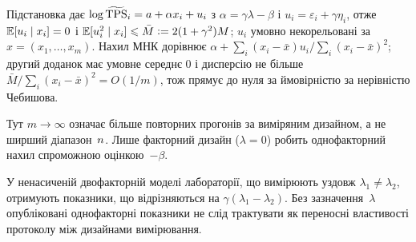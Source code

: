 \begin{Proof}
Підстановка дає $\log\widetilde{\mathrm{TPS}}_{i}=a+\alpha x_{i}+u_{i}$ з
$\alpha=\gamma\lambda-\beta$ і $u_{i}=\varepsilon_{i}+\gamma\eta_{i}$, отже
$\mathbb{E}[u_{i}\mid x_{i}]=0$ і $\mathbb{E}[u_{i}^{2}\mid x_{i}]\leqslant\bar M\mathrel{\mathop:}=2(1+\gamma^{2})M$;
$u_{i}$ умовно некорельовані за $x=(x_{1},\dots,x_{m})$. Нахил МНК дорівнює
$\alpha+\sum_{i}(x_{i}-\bar x)u_{i}/\sum_{i}(x_{i}-\bar x)^{2}$; другий доданок
має умовне середнє $0$ і дисперсію не більше
$\bar M/\sum_{i}(x_{i}-\bar x)^{2}=O(1/m)$, тож прямує до нуля за
ймовірністю за нерівністю Чебишова.
\end{Proof}

Тут $m\to\infty$ означає більше повторних прогонів за виміряним дизайном, а не
ширший діапазон~$n$. Лише факторний дизайн ($\lambda=0$) робить однофакторний
нахил спроможною оцінкою~$-\beta$.

\begin{Corollary}
\label{cor:sign}
У ненасиченій двофакторній моделі лабораторії, що вимірюють уздовж
$\lambda_{1}\ne\lambda_{2}$, отримують показники, що відрізняються на
$\gamma(\lambda_{1}-\lambda_{2})$. Без зазначення~$\lambda$ опубліковані
однофакторні показники не слід трактувати як переносні властивості протоколу між
дизайнами вимірювання.
\end{Corollary}
